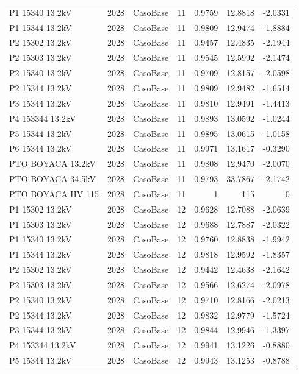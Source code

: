 \documentclass[11pt,a4paper]{article}
\begin{document}
\begin{longtable}{llllrrr}
P1 15340 13.2kV & 2028 & CasoBase & 11 & 0.9759 & 12.8818 & -2.0331 \\
P1 15344 13.2kV & 2028 & CasoBase & 11 & 0.9809 & 12.9474 & -1.8884 \\
P2 15302 13.2kV & 2028 & CasoBase & 11 & 0.9457 & 12.4835 & -2.1944 \\
P2 15303 13.2kV & 2028 & CasoBase & 11 & 0.9545 & 12.5992 & -2.1474 \\
P2 15340 13.2kV & 2028 & CasoBase & 11 & 0.9709 & 12.8157 & -2.0598 \\
P2 15344 13.2kV & 2028 & CasoBase & 11 & 0.9809 & 12.9482 & -1.6514 \\
P3 15344 13.2kV & 2028 & CasoBase & 11 & 0.9810 & 12.9491 & -1.4413 \\
P4 153344 13.2kV & 2028 & CasoBase & 11 & 0.9893 & 13.0592 & -1.0244 \\
P5 15344 13.2kV & 2028 & CasoBase & 11 & 0.9895 & 13.0615 & -1.0158 \\
P6 15344 13.2kV & 2028 & CasoBase & 11 & 0.9971 & 13.1617 & -0.3290 \\
PTO BOYACA 13.2kV & 2028 & CasoBase & 11 & 0.9808 & 12.9470 & -2.0070 \\
PTO BOYACA 34.5kV & 2028 & CasoBase & 11 & 0.9793 & 33.7867 & -2.1742 \\
PTO BOYACA HV 115 & 2028 & CasoBase & 11 & 1 & 115 & 0 \\
P1 15302 13.2kV & 2028 & CasoBase & 12 & 0.9628 & 12.7088 & -2.0639 \\
P1 15303 13.2kV & 2028 & CasoBase & 12 & 0.9688 & 12.7887 & -2.0322 \\
P1 15340 13.2kV & 2028 & CasoBase & 12 & 0.9760 & 12.8838 & -1.9942 \\
P1 15344 13.2kV & 2028 & CasoBase & 12 & 0.9818 & 12.9592 & -1.8357 \\
P2 15302 13.2kV & 2028 & CasoBase & 12 & 0.9442 & 12.4638 & -2.1642 \\
P2 15303 13.2kV & 2028 & CasoBase & 12 & 0.9566 & 12.6274 & -2.0978 \\
P2 15340 13.2kV & 2028 & CasoBase & 12 & 0.9710 & 12.8166 & -2.0213 \\
P2 15344 13.2kV & 2028 & CasoBase & 12 & 0.9832 & 12.9779 & -1.5724 \\
P3 15344 13.2kV & 2028 & CasoBase & 12 & 0.9844 & 12.9946 & -1.3397 \\
P4 153344 13.2kV & 2028 & CasoBase & 12 & 0.9941 & 13.1226 & -0.8880 \\
P5 15344 13.2kV & 2028 & CasoBase & 12 & 0.9943 & 13.1253 & -0.8788 \\

\end{longtable}
\end{document}

